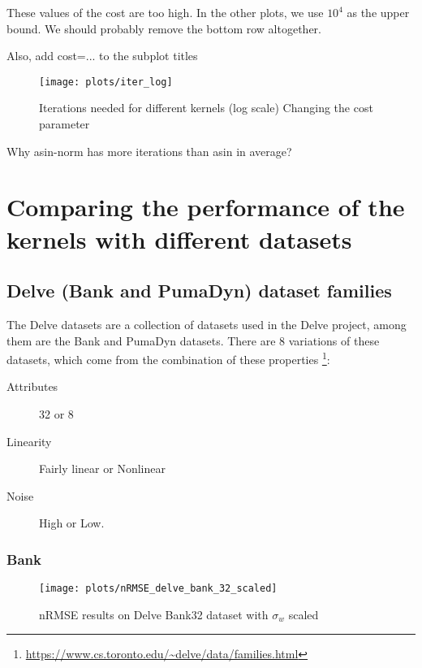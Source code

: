 \begin{cnote}
    These values of the cost are too high.
    In the other plots, we use $10^4$ as the upper bound.
    We should probably remove the bottom row altogether.

    Also, add cost=... to the subplot titles
\end{cnote}

\begin{figure}[H]
    \texttt{[image: plots/iter\_log]}
    \caption{Iterations needed for different kernels (log scale) Changing the cost
        parameter}
\end{figure}

\begin{cnote}
    Why asin-norm has more iterations than asin in average?
\end{cnote}

\section{Comparing the performance of the kernels with different datasets}%

\subsection{Delve (Bank and PumaDyn) dataset families}

The Delve datasets are a collection of datasets used in the Delve project,
among them are the Bank and PumaDyn datasets. There are 8 variations of
these datasets, which come from the combination of these properties%
\footnote{\url{https://www.cs.toronto.edu/~delve/data/families.html}}:
\begin{description}
    \item[Attributes] 32 or 8
    \item[Linearity] Fairly linear or Nonlinear
    \item[Noise] High or Low.
\end{description}


\subsubsection{Bank}

\begin{figure}[H]
    \texttt{[image: plots/nRMSE\_delve\_bank\_32\_scaled]}
    \caption{nRMSE results on Delve Bank32 dataset with $\sigma_w$ scaled}
    \label{fig:nrmse-delve-bank-32-scaled}
\end{figure}

